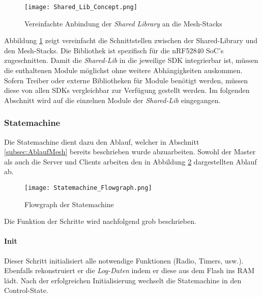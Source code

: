 \begin{figure}[H]
	\centering
	\texttt{[image: Shared\_Lib\_Concept.png]}
	\caption{Vereinfachte Anbindung der \textit{Shared Library} an die Mesh-Stacks}\label{fig:ShardeLibConcept}
\end{figure}

Abbildung \ref{fig:ShardeLibConcept} zeigt vereinfacht die Schnittstellen zwischen der Shared-Library und den Mesh-Stacks.
Die Bibliothek ist spezifisch für die nRF52840 SoC's zugeschnitten.
Damit die \textit{Shared-Lib} in die jeweilige SDK integrierbar ist, müssen die enthaltenen Module möglichst ohne weitere Abhängigkeiten auskommen.
Sofern Treiber oder externe Bibliotheken für Module benötigt werden, müssen diese von allen SDKs vergleichbar zur Verfügung gestellt werden.
Im folgenden Abschnitt wird auf die einzelnen Module der \textit{Shared-Lib} eingegangen. 


\subsubsection{Statemachine}\label{subsubsec:StatemachineSoftware}

Die Statemachine dient dazu den Ablauf, welcher in Abschnitt \ref{subsec:AblaufMesh} bereits beschrieben wurde abzuarbeiten. Sowohl der Master als auch die Server und Clients arbeiten den in Abbildung \ref{fig:StatemachineFLowgraph} dargestellten Ablauf ab. 

\begin{figure}[H]
	\centering
	\texttt{[image: Statemachine\_Flowgraph.png]}
	\caption{Flowgraph der Statemachine}\label{fig:StatemachineFLowgraph}
\end{figure}


Die Funktion der Schritte wird nachfolgend grob beschrieben.
\paragraph{Init}
	Dieser Schritt initialisiert alle notwendige Funktionen (Radio, Timers, usw.). Ebenfalls rekonstruiert er die \textit{Log-Daten} indem er diese aus dem Flash ins RAM lädt. Nach der erfolgreichen Initialisierung wechselt die Statemachine in den Control-State.
	
